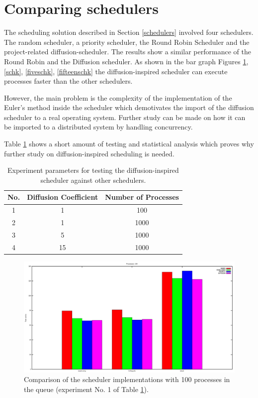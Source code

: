 	\section{Comparing schedulers}
\label{sca}
The scheduling solution described in Section \ref{schedulers}
involved four schedulers. The random scheduler, a priority scheduler, the Round Robin Scheduler and the project-related diffusion-scheduler. The results show a similar performance of the Round Robin and the Diffusion scheduler. As shown in the bar graph Figures \ref{schh}, \ref{schk}, \ref{fiveschk}, \ref{fifteenschk}
the diffusion-inspired scheduler can execute processes faster than the other schedulers.

However, the main problem is the complexity of the implementation of the Euler's method inside the scheduler which demotivates the import of the diffusion scheduler to a real operating system. Further study can be made on how it can be imported to a distributed system by handling concurrency.

Table \ref{schtable} shows a short amount of testing and statistical analysis which proves why further study on diffusion-inspired scheduling is needed.  

\begin{table}
\caption{Experiment parameters for testing the diffusion-inspired scheduler against other schedulers.}
\label{schtable}
\begin{center}
\begin{tabular}{| c | c | c |}
\hline
No. & Diffusion Coefficient &  Number of Processes \\ \hline
1 & 1 & 100 \\ \hline
2 & 1 & 1000 \\ \hline
3 & 5 & 1000 \\ \hline
4 & 15 & 1000 \\ \hline
\end{tabular}
\end{center}
\end{table}

\begin{figure}
\centering
\includegraphics[scale=0.3]{sch100.png}
\caption{Comparison of the scheduler implementations with 100 processes in the queue (experiment No. 1 of Table \ref{schtable}).}
\label{schh}
\end{figure}

